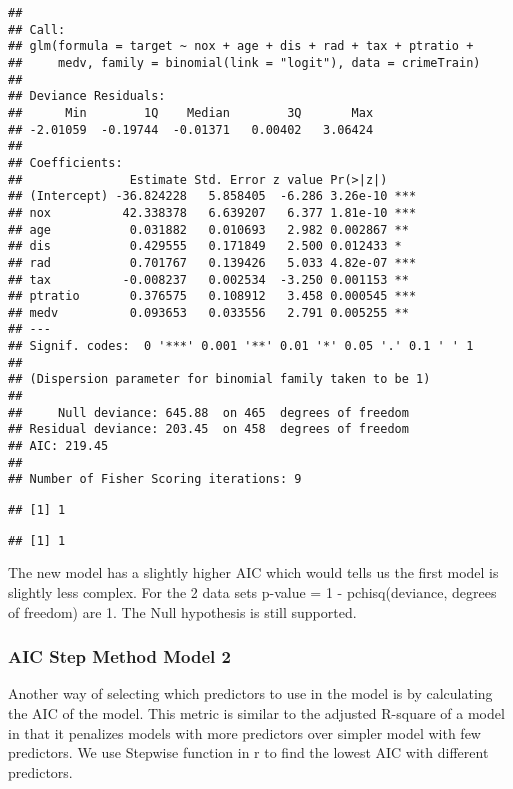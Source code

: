 \documentclass[
]{article}
\begin{document}
\begin{verbatim}
## 
## Call:
## glm(formula = target ~ nox + age + dis + rad + tax + ptratio + 
##     medv, family = binomial(link = "logit"), data = crimeTrain)
## 
## Deviance Residuals: 
##      Min        1Q    Median        3Q       Max  
## -2.01059  -0.19744  -0.01371   0.00402   3.06424  
## 
## Coefficients:
##               Estimate Std. Error z value Pr(>|z|)    
## (Intercept) -36.824228   5.858405  -6.286 3.26e-10 ***
## nox          42.338378   6.639207   6.377 1.81e-10 ***
## age           0.031882   0.010693   2.982 0.002867 ** 
## dis           0.429555   0.171849   2.500 0.012433 *  
## rad           0.701767   0.139426   5.033 4.82e-07 ***
## tax          -0.008237   0.002534  -3.250 0.001153 ** 
## ptratio       0.376575   0.108912   3.458 0.000545 ***
## medv          0.093653   0.033556   2.791 0.005255 ** 
## ---
## Signif. codes:  0 '***' 0.001 '**' 0.01 '*' 0.05 '.' 0.1 ' ' 1
## 
## (Dispersion parameter for binomial family taken to be 1)
## 
##     Null deviance: 645.88  on 465  degrees of freedom
## Residual deviance: 203.45  on 458  degrees of freedom
## AIC: 219.45
## 
## Number of Fisher Scoring iterations: 9
\end{verbatim}

\begin{verbatim}
## [1] 1
\end{verbatim}

\begin{verbatim}
## [1] 1
\end{verbatim}

The new model has a slightly higher AIC which would tells us the first
model is slightly less complex. For the 2 data sets p-value = 1 -
pchisq(deviance, degrees of freedom) are 1. The Null hypothesis is still
supported.

\hypertarget{aic-step-method-model-2}{%
\subsubsection{AIC Step Method Model 2}\label{aic-step-method-model-2}}

Another way of selecting which predictors to use in the model is by
calculating the AIC of the model. This metric is similar to the adjusted
R-square of a model in that it penalizes models with more predictors
over simpler model with few predictors. We use Stepwise function in r to
find the lowest AIC with different predictors.
\end{document}
